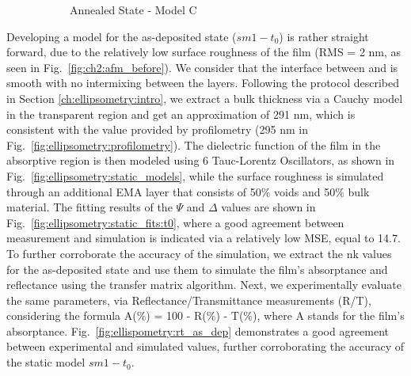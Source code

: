\begin{figure}[t]
\begin{subfigure}[t]{0.4\textwidth}
        \caption{Annealed State - Model C}
        \label{fig:ellipsometry:static_fits:t23_fixed_thick_x_void}
    \end{subfigure}
    \caption{}
    \label{fig:ellipsometry:static_fits}
\end{figure}

Developing a model for the as-deposited state ($sm1-t_0$) is rather straight forward, due to the relatively low surface roughness of the film (RMS = 2 nm, as seen in Fig.~\ref{fig:ch2:afm_before}). We consider that the interface between  and  is smooth with no intermixing between the layers. Following the protocol described in Section \ref{ch:ellipsometry:intro}, we extract a bulk thickness via a Cauchy model in the transparent region and get an approximation of 291 nm, which is consistent with the value provided by profilometry (295 nm in Fig.~\ref{fig:ellipsometry:profilometry}). The dielectric function of the film in the absorptive region is then modeled using 6 Tauc-Lorentz Oscillators, as shown in Fig.~\ref{fig:ellipsometry:static_models}, while the surface roughness is simulated through an additional EMA layer that consists of 50\% voids and 50\% bulk material. The fitting results of the $\Psi$ and $\Delta$ values are shown in Fig.~\ref{fig:ellipsometry:static_fits:t0}, where a good agreement between measurement and simulation is indicated via a relatively low MSE, equal to 14.7. To further corroborate the accuracy of the simulation, we extract the nk values for the as-deposited state and use them to simulate the film's absorptance and reflectance using the transfer matrix algorithm. Next, we experimentally evaluate the same parameters, via Reflectance/Transmittance measurements (R/T), considering the formula A(\%) = 100 - R(\%) - T(\%), where A stands for the film's absorptance. Fig.~\ref{fig:ellispometry:rt_as_dep} demonstrates a good agreement between experimental and simulated values, further corroborating the accuracy of the static model $sm1-t_0$.


